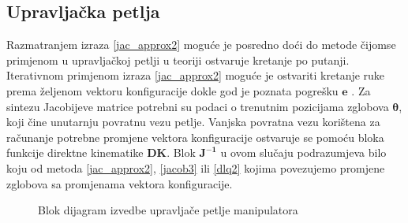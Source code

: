 \documentclass[times, utf8, diplomski, numeric]{fer}
\begin{document}
\subsection{Upravljačka petlja}\label{kin_upr}
Razmatranjem izraza \ref{jac_approx2} moguće je posredno doći do metode čijomse primjenom u upravljačkoj petlji u teoriji ostvaruje kretanje po putanji. 
Iterativnom primjenom izraza \ref{jac_approx2} moguće je ostvariti kretanje ruke prema željenom vektoru konfiguracije dokle god je poznata pogrešku $\mathbf{e}$ . 
Za sintezu Jacobijeve matrice potrebni su podaci o trenutnim pozicijama zglobova $\bm{\theta}$, koji čine unutarnju povratnu vezu petlje.
Vanjska povratna vezu korištena za računanje potrebne promjene vektora konfiguracije ostvaruje se pomoću bloka funkcije direktne kinematike \textbf{DK}.
Blok $\mathbf{J^{-1}}$ u ovom slučaju podrazumjeva bilo koju od metoda \ref{jac_approx2}, \ref{jacob3} ili \ref{dlq2} kojima povezujemo promjene zglobova sa promjenama vektora konfiguracije.
\begin{figure}[!h]
\centering
{}
\caption{Blok dijagram izvedbe upravljače petlje manipulatora} \label{petlja}
\end{figure}
\end{document}
